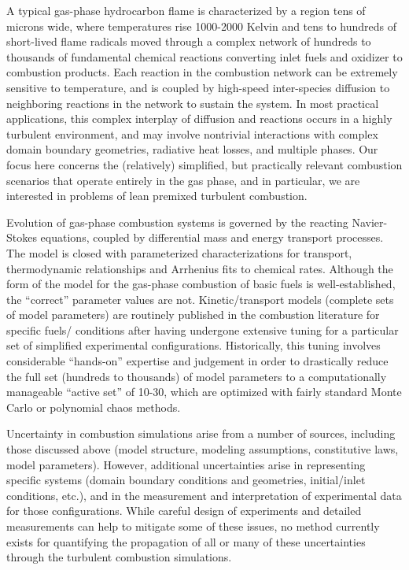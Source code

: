 \documentclass[11pt]{article}
\begin{document}
A typical gas-phase hydrocarbon flame is characterized by a region
tens of microns wide, where temperatures rise 1000-2000 Kelvin and
tens to hundreds of short-lived flame radicals moved through a complex
network of hundreds to thousands of fundamental chemical reactions
converting inlet fuels and oxidizer to combustion products.  Each
reaction in the combustion network can be extremely sensitive to
temperature, and is coupled by high-speed inter-species diffusion to
neighboring reactions in the network to sustain the system.  In most
practical applications, this complex interplay of diffusion and
reactions occurs in a highly turbulent environment, and may involve
nontrivial interactions with complex domain boundary geometries,
radiative heat losses, and multiple phases.  Our focus here concerns
the (relatively) simplified, but practically relevant combustion
scenarios that operate entirely in the gas phase, and in particular,
we are interested in problems of lean premixed turbulent combustion.

Evolution of gas-phase combustion systems is governed by the reacting
Navier-Stokes equations, coupled by
differential mass and energy transport processes.  The model is 
closed with
parameterized characterizations for transport, thermodynamic
relationships and Arrhenius fits to chemical rates.
Although the form of the model for the gas-phase combustion of basic
fuels is well-established, the ``correct'' parameter values are not.
Kinetic\slash transport models (complete sets of model parameters) are routinely
published in the combustion literature for specific fuels\slash
conditions after having undergone extensive tuning
for a particular set of
simplified experimental configurations.  Historically, this tuning involves 
considerable ``hands-on'' expertise and judgement in
order to drastically reduce the full set (hundreds to thousands) of
model parameters to a computationally manageable ``active set'' of
10-30, which are optimized with fairly standard Monte Carlo or
polynomial chaos methods.

Uncertainty in combustion simulations arise from a number of sources,
including those discussed above (model structure, modeling
assumptions, constitutive laws, model parameters).  However,
additional uncertainties arise in representing specific systems
(domain boundary conditions and geometries, initial\slash inlet
conditions, etc.), and in the measurement and interpretation of
experimental data for those configurations.  While careful design of
experiments and detailed measurements can help to mitigate some of
these issues, no method currently exists for quantifying the
propagation of all or many of these uncertainties through the
turbulent combustion simulations.
\end{document}
